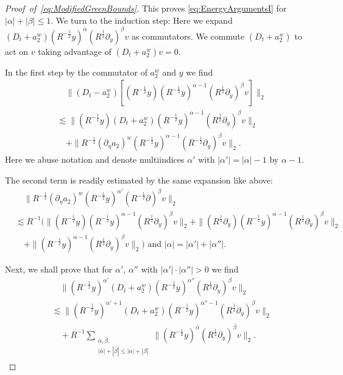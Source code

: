 \documentclass{amsart}
\theoremstyle{definition}
\begin{document}
\begin{proof}[Proof~of~\eqref{eq:ModifiedGreenBounds}]
This proves \eqref{eq:EnergyArgumentsI} for $|\alpha| + |\beta| \leq 1$. We turn to the induction step: Here we expand $(D_t + a_{2}^w) (R^{-\frac{1}{2}} y)^{\alpha} (R^{\frac{1}{2}} \partial_y)^{\beta} v$ as commutators. We commute $(D_t + a_{2}^w)$ to act on $v$ taking advantage of $(D_t + a_{2}^w)v = 0$.

In the first step by the commutator of $a_{2}^w$ and $y$ we find
\begin{equation*}
\begin{split}
&\quad \| (D_t - a_{2}^w) [(R^{-\frac{1}{2}} y) (R^{-\frac{1}{2}} y)^{\alpha-1} (R^{\frac{1}{2}} \partial_y)^{\beta} v] \|_2 \\ &\lesssim \| (R^{-\frac{1}{2}} y) (D_t + a_{2}^w) (R^{-\frac{1}{2}} y)^{\alpha-1} (R^{\frac{1}{2}} \partial_y)^{\beta} v \|_2 \\
&\quad + \| R^{-\frac{1}{2}} (\partial_{\eta} a_{2})^w (R^{-\frac{1}{2}} y)^{\alpha-1} (R^{-\frac{1}{2}} \partial_y)^{\beta} v \|_2.
\end{split}
\end{equation*}
Here we abuse notation and denote multiindices $\alpha'$ with $|\alpha'| = |\alpha|- 1$ by $\alpha -1 $.

The second term is readily estimated by the same expansion like above:
\begin{equation*}
\begin{split}
&\quad \| R^{-\frac{1}{2}} (\partial_{\eta} a_2)^w (R^{-\frac{1}{2}} y)^{\alpha'} (R^{-\frac{1}{2}} \partial)^{\beta} v \|_2 \\
&\lesssim R^{-1} ( \| (R^{-\frac{1}{2}} y) (R^{-\frac{1}{2}} y)^{\alpha-1} (R^{\frac{1}{2}} \partial_y)^{\beta} v \|_2 + \| (R^{\frac{1}{2}} \partial_y ) (R^{-\frac{1}{2}} y)^{\alpha-1} (R^{\frac{1}{2}} \partial_y)^{\beta} v \|_2 \\
&\quad + \| (R^{-\frac{1}{2}} y)^{\alpha-1} (R^{\frac{1}{2}} \partial_y)^{\beta} v \|_2) \text{ and } |\alpha| = |\alpha'| + |\alpha''|.
\end{split}
\end{equation*}

Next, we shall prove that for $\alpha'$, $\alpha''$ with $|\alpha'| \cdot |\alpha''| > 0$ we find
\begin{equation}
\label{eq:AuxEnergyEst}
\begin{split}
&\quad \| (R^{-\frac{1}{2}} y)^{\alpha'} (D_t + a_{2}^w) (R^{-\frac{1}{2}} y)^{\alpha''} (R^{\frac{1}{2}} \partial_y)^{\beta} v \|_2 \\ &\lesssim \| (R^{-\frac{1}{2}} y)^{\alpha'+1} (D_t + a_{2}^w) (R^{-\frac{1}{2}} y)^{\alpha''-1} (R^{\frac{1}{2}} \partial_y)^{\beta} v \|_2 \\
&\quad + R^{-1} \sum_{\substack{\bar{\alpha},\bar{\beta}, \\ |\bar{\alpha}| + |\bar{\beta}| \leq |\alpha| + |\beta|}} \| (R^{-\frac{1}{2}} y)^{\bar{\alpha}} (R^{\frac{1}{2}} \partial_y)^{\bar{\beta}} v \|_2. 
\end{split}
\end{equation}


\end{proof}
\end{document}
